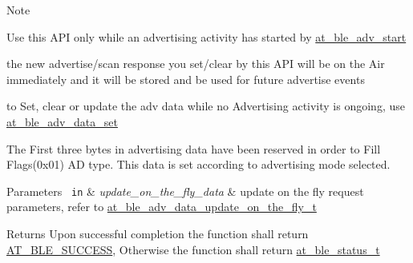 \begin{DoxyNote}{Note}
\begin{DoxyItemize}
\item Use this A\+PI only while an advertising activity has started by \mbox{\hyperlink{group__gap__adv__group_ga1a780803d17a447dee42b1afdae1e165}{at\+\_\+ble\+\_\+adv\+\_\+start}}
\item the new advertise/scan response you set/clear by this A\+PI will be on the Air immediately and it will be stored and be used for future advertise events
\item to Set, clear or update the adv data while no Advertising activity is ongoing, use \mbox{\hyperlink{group__gap__adv__group_gaf4472b661944026a537f3fe2f65b8fcc}{at\+\_\+ble\+\_\+adv\+\_\+data\+\_\+set}}
\item The First three bytes in advertising data have been reserved in order to Fill Flags(0x01) AD type. This data is set according to advertising mode selected.
\end{DoxyItemize}
\end{DoxyNote}

\begin{DoxyParams}[1]{Parameters}
\mbox{\texttt{ in}}  & {\em update\+\_\+on\+\_\+the\+\_\+fly\+\_\+data} & update on the fly request parameters, refer to \mbox{\hyperlink{structat__ble__adv__data__update__on__the__fly__t}{at\+\_\+ble\+\_\+adv\+\_\+data\+\_\+update\+\_\+on\+\_\+the\+\_\+fly\+\_\+t}}\\
\hline
\end{DoxyParams}
\begin{DoxyReturn}{Returns}
Upon successful completion the function shall return \mbox{\hyperlink{group__error__codes__group_gga3b1db9b95feb157b3c188ca27fe76988a7e3bfff5387331cd4f2c56cbcbbd7e19}{A\+T\+\_\+\+B\+L\+E\+\_\+\+S\+U\+C\+C\+E\+SS}}, Otherwise the function shall return \mbox{\hyperlink{at__ble__api_8h_ace24eb4e5ca3f325c663b809da5feb92}{at\+\_\+ble\+\_\+status\+\_\+t}} 
\end{DoxyReturn}
\mbox{\label{group__gap__adv__group_ga1a780803d17a447dee42b1afdae1e165}} 
